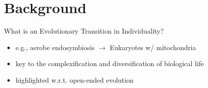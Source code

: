 \section{Background}

\begin{frame}{What is an Evolutionary Transition in Individuality?}

\Large

\begin{itemize}[<+->]
\item e.g., aerobe endosymbiosis $\rightarrow$ Eukaryotes w/ mitochondria \cite{sagan1967origin}
\item key to the complexification and diversification of biological life \cite{smith1997major}
\item highlighted w.r.t. open-ended evolution \cite{ray1996evolving, banzhaf2016defining}
\end{itemize}

\end{frame}

